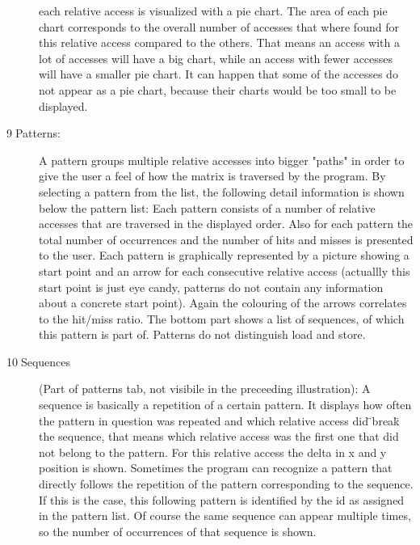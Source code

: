 \begin{description}
each relative access is visualized with a pie chart. The area of each
pie chart corresponds to the overall number of accesses that where
found for this relative access compared to the others. That means
an access with a lot of accesses will have a big chart, while an access
with fewer accesses will have a smaller pie chart. It can happen that
some of the accesses do not appear as a pie chart, because their charts
would be too small to be displayed.
\item [{9$\;$Patterns:}] A pattern groups multiple relative accesses
into bigger "paths" in order to give the user a feel of how the matrix
is traversed by the program. By selecting a pattern from the list,
the following detail information is shown below the pattern list:
Each pattern consists of a number of relative accesses that are traversed
in the displayed order. Also for each pattern the total number of
occurrences and the number of hits and misses is presented to the
user. Each pattern is graphically represented by a picture showing
a start point and an arrow for each consecutive relative access (actuallly
this start point is just eye candy, patterns do not contain any information
about a concrete start point). Again
the colouring of the arrows correlates to the hit/miss ratio. The
bottom part shows a list of sequences, of which this pattern is part
of. Patterns do not distinguish load and store.
\item [{10$\;$Sequences}] (Part of patterns tab, not visibile in the preceeding
illustration): A sequence is basically a repetition of a certain pattern.
It displays how often the pattern in question was repeated and which
relative access did \"{}break\"{} the sequence,
that means which relative access was the first one that did not belong
to the pattern. For this relative access the delta in x and y position
is shown. Sometimes the program can recognize a pattern that directly
follows the repetition of the pattern corresponding to the sequence.
If this is the case, this following pattern is identified by the id
as assigned in the pattern list. Of course the same sequence can appear
multiple times, so the number of occurrences of that sequence is shown.\end{description}
